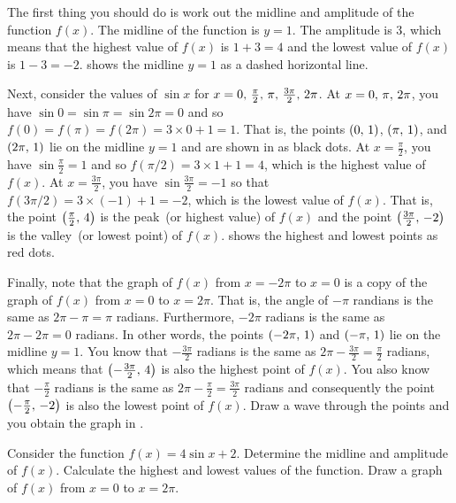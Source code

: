 \documentclass[a4paper,oneside,12pt]{article}
\begin{document}
\begin{solution}
The first thing you should do is work out the midline and amplitude of
the function $f(x)$.  The midline of the function is $y = 1$.  The
amplitude is $3$, which means that the highest value of $f(x)$ is
$1 + 3 = 4$ and the lowest value of $f(x)$ is $1 - 3 = -2$.
 shows the midline
$y = 1$ as a dashed horizontal line.

Next, consider the values of $\sin x$ for
$x = {0},\, {\frac{\pi}{2}},\, {\pi},\, {\frac{3\pi}{2}},\, {2\pi}$.  At
$x = {0},\, {\pi},\, {2\pi}$, you have
$\sin 0 = \sin \pi = \sin 2\pi = 0$ and so
$f(0) = f(\pi) = f(2\pi) = 3 \times 0 + 1 = 1$.  That is, the points
$\left\lparen{0},\, {1}\right\rparen$, $\left\lparen{\pi},\, {1}\right\rparen$, and $\left\lparen{2\pi},\, {1}\right\rparen$ lie on the
midline $y = 1$ and are shown in
 as black dots.  At
$x = \frac{\pi}{2}$, you have $\sin \frac{\pi}{2} = 1$ and so
$f(\pi/2) = 3 \times 1 + 1 = 4$, which is the highest value of
$f(x)$.  At $x = \frac{3\pi}{2}$, you have
$\sin \frac{3\pi}{2} = -1$ so that
$f(3\pi / 2) = 3 \times (-1) + 1 = -2$, which is the lowest value of
$f(x)$.  That is, the point $\left\lparen{\frac{\pi}{2}},\, {4}\right\rparen$ is the peak~(or
highest value) of $f(x)$ and the point
$\left\lparen{\frac{3\pi}{2}},\, {-2}\right\rparen$ is the valley~(or lowest point) of
$f(x)$.   shows the highest and
lowest points as red dots.

Finally, note that the graph of $f(x)$ from $x = -2\pi$ to
$x = 0$ is a copy of the graph of $f(x)$ from $x = 0$ to $x = 2\pi$.
That is, the angle of $-\pi$ randians is the same as
$2\pi - \pi = \pi$ radians.  Furthermore, $-2\pi$ radians is the same
as $2\pi - 2\pi = 0$ radians.  In other words, the points
$\left\lparen{-2\pi},\, {1}\right\rparen$ and $\left\lparen{-\pi},\, {1}\right\rparen$ lie on the midline
$y = 1$.  You know that $-\frac{3\pi}{2}$ radians is the same as
$2\pi - \frac{3\pi}{2} = \frac{\pi}{2}$ radians, which means that
$\left\lparen{-\frac{3\pi}{2}},\, {4}\right\rparen$ is also the highest point of $f(x)$.  You
also know that $-\frac{\pi}{2}$ radians is the same as
$2\pi - \frac{\pi}{2} = \frac{3\pi}{2}$ radians and consequently the
point $\left\lparen{-\frac{\pi}{2}},\, {-2}\right\rparen$ is also the lowest point of
$f(x)$.  Draw a wave through the points and you obtain the graph in
.
\end{solution}

\begin{exercise}
Consider the function $f(x) = 4 \sin x + 2$.  Determine the midline
and amplitude of $f(x)$.  Calculate the highest and lowest values of
the function.  Draw a graph of $f(x)$ from $x = 0$ to $x = 2\pi$.
\end{exercise}
\end{document}
